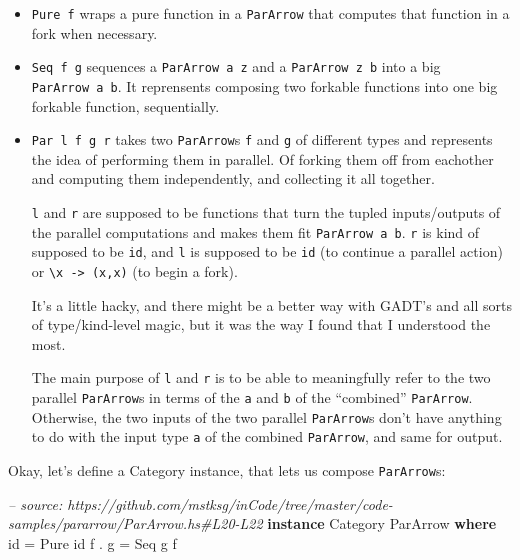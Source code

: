 \documentclass[]{article}
\newenvironment{Shaded}{\begin{snugshade}}{\end{snugshade}}
\newcommand{\CommentTok}[1]{\textcolor[rgb]{0.56,0.35,0.01}{\textit{#1}}}
\newcommand{\DataTypeTok}[1]{\textcolor[rgb]{0.13,0.29,0.53}{#1}}
\newcommand{\FunctionTok}[1]{\textcolor[rgb]{0.00,0.00,0.00}{#1}}
\newcommand{\KeywordTok}[1]{\textcolor[rgb]{0.13,0.29,0.53}{\textbf{#1}}}
\newcommand{\NormalTok}[1]{#1}
\begin{document}
\begin{itemize}
\item
  \texttt{Pure\ f} wraps a pure function in a \texttt{ParArrow} that computes
  that function in a fork when necessary.
\item
  \texttt{Seq\ f\ g} sequences a \texttt{ParArrow\ a\ z} and a
  \texttt{ParArrow\ z\ b} into a big \texttt{ParArrow\ a\ b}. It reprensents
  composing two forkable functions into one big forkable function, sequentially.
\item
  \texttt{Par\ l\ f\ g\ r} takes two \texttt{ParArrow}s \texttt{f} and
  \texttt{g} of different types and represents the idea of performing them in
  parallel. Of forking them off from eachother and computing them independently,
  and collecting it all together.

  \texttt{l} and \texttt{r} are supposed to be functions that turn the tupled
  inputs/outputs of the parallel computations and makes them fit
  \texttt{ParArrow\ a\ b}. \texttt{r} is kind of supposed to be \texttt{id}, and
  \texttt{l} is supposed to be \texttt{id} (to continue a parallel action) or
  \texttt{\textbackslash{}x\ -\textgreater{}\ (x,x)} (to begin a fork).

  It's a little hacky, and there might be a better way with GADT's and all sorts
  of type/kind-level magic, but it was the way I found that I understood the
  most.

  The main purpose of \texttt{l} and \texttt{r} is to be able to meaningfully
  refer to the two parallel \texttt{ParArrow}s in terms of the \texttt{a} and
  \texttt{b} of the ``combined'' \texttt{ParArrow}. Otherwise, the two inputs of
  the two parallel \texttt{ParArrow}s don't have anything to do with the input
  type \texttt{a} of the combined \texttt{ParArrow}, and same for output.
\end{itemize}

Okay, let's define a Category instance, that lets us compose \texttt{ParArrow}s:

\begin{Shaded}
\begin{Highlighting}[]
\CommentTok{-- source: https://github.com/mstksg/inCode/tree/master/code-samples/pararrow/ParArrow.hs#L20-L22}
\KeywordTok{instance} \DataTypeTok{Category} \DataTypeTok{ParArrow} \KeywordTok{where}
\NormalTok{    id    }\FunctionTok{=} \DataTypeTok{Pure}\NormalTok{ id}
\NormalTok{    f }\FunctionTok{.}\NormalTok{ g }\FunctionTok{=} \DataTypeTok{Seq}\NormalTok{ g f}
\end{Highlighting}
\end{Shaded}
\end{document}
